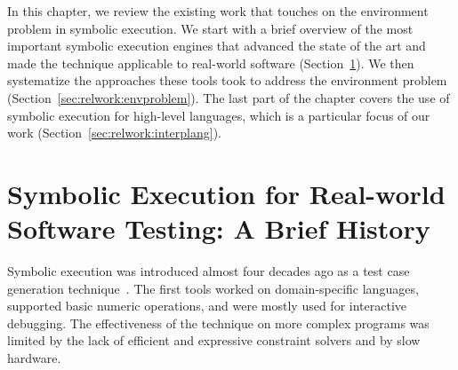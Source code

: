 

In this chapter, we review the existing work that touches on the environment problem in symbolic execution.
%
We start with a brief overview of the most important symbolic execution engines that advanced the state of the art and made the technique applicable to real-world software (Section~\ref{sec:relwork:atcg}).
%
We then systematize the approaches these tools took to address the environment problem (Section~\ref{sec:relwork:envproblem}).
%
The last part of the chapter covers the use of symbolic execution for high-level languages, which is a particular focus of our work (Section~\ref{sec:relwork:interplang}).



\section{Symbolic Execution for Real-world Software Testing: A Brief History}
\label{sec:relwork:atcg}


Symbolic execution was introduced almost four decades ago as a test case generation technique~\cite{king:symbolic:2, boyer:symbolic}.  The first tools worked on domain-specific languages, supported basic numeric operations, and were mostly used for interactive debugging.  The effectiveness of the technique on more complex programs was limited by the lack of efficient and expressive constraint solvers and by slow hardware.

